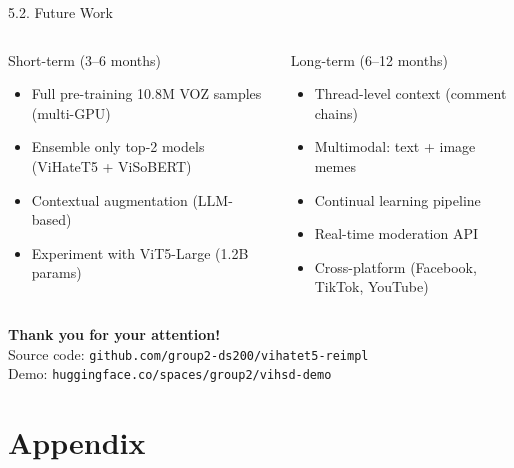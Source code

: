 \documentclass[11pt, aspectratio=169]{beamer}
\begin{document}
\begin{frame}{5.2. Future Work}

\begin{columns}[T]
  \begin{block}{Short-term (3--6 months)}
    \begin{itemize}
      \item Full pre-training 10.8M VOZ samples (multi-GPU)
      \item Ensemble only top-2 models (ViHateT5 + ViSoBERT)
      \item Contextual augmentation (LLM-based)
      \item Experiment with ViT5-Large (1.2B params)
    \end{itemize}
  \end{block}

  \begin{block}{Long-term (6--12 months)}
    \begin{itemize}
      \item Thread-level context (comment chains)
      \item Multimodal: text + image memes
      \item Continual learning pipeline
      \item Real-time moderation API
      \item Cross-platform (Facebook, TikTok, YouTube)
    \end{itemize}
  \end{block}
\end{columns}

\vspace{0.3cm}
\begin{center}
  \Large\textbf{Thank you for your attention!}\\[0.3cm]
  \normalsize
  Source code: \texttt{github.com/group2-ds200/vihatet5-reimpl}\\
  Demo: \texttt{huggingface.co/spaces/group2/vihsd-demo}
\end{center}
\end{frame}

\section{Appendix}
\end{document}
